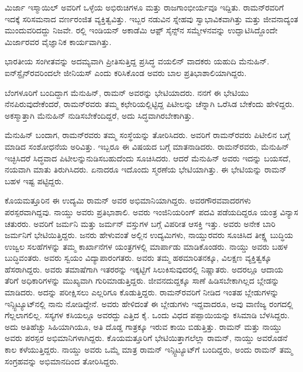 ಮಿರ್ಜಾ ಇಸ್ಮಾಯಿಲ್ ಅವರಿಗೆ ಒಳ್ಳೆಯ ಅಭಿರುಚಿಗಳೂ ಮತ್ತು ರಾಜಗಾಂಭೀರ್ಯವೂ ಇದ್ದಿತು. ರಾಮನ್‍ರವರಿಗೆ ಇದಕ್ಕೆ ಸರಿಸಮನಾದ ವರ್ಣರಂಜಿತ ವ್ಯಕ್ತಿತ್ವವಿತ್ತು. ಇಬ್ಬರ ನಡುವಿನ ಸ್ನೇಹವು ಸ್ವಾಭಾವಿಕವಾಗಿತ್ತು ಮತ್ತು ಜೀವನಾದ್ಯಂತ ಮುಂದುವರಿದದ್ದು ನಿಜವೇ. ರಲ್ಲಿ ಇಂಡಿಯನ್ ಅಕಾಡೆಮಿ ಆಫ಼್ ಸೈನ್ಸ್‌ನ ಸಮ್ಮೇಳನವನ್ನು ಉದ್ಘಾಟಿಸಿದ್ದೊಂದೇ ಮಿರ್ಜಾರವರ ವೈಜ್ಞಾನಿಕ ಕಾರ್ಯವಾಗಿತ್ತು.



ಭಾರತೀಯ ಸಂಗೀತವನ್ನು ಅದಮ್ಯವಾಗಿ ಪ್ರೀತಿಸುತ್ತಿದ್ದ ಪ್ರಸಿದ್ಧ ವಯಲಿನ್ ವಾದಕರು ಯಹುದಿ ಮೆನುಹಿನ್. ಐನ್‍ಸ್ಟೈನ್‍ರವರಿಂದಲೇ ಜೀನಿಯಸ್ ಎಂದು ಕರಿಸಿಕೊಂಡ ಅವರು ಬಾಲ ಪ್ರತಿಭಾಶಾಲಿಯಾಗಿದ್ದರು.

ಬೆಂಗಳೂರಿಗೆ ಬಂದಿದ್ದಾಗ ಮೆನುಹಿನ್, ರಾಮನ್ ಅವರನ್ನು ಭೇಟಿಯಾದರು. ನನಗೆ ಈ ಭೇಟಿಯು ನೆನಪಿರುವುದೇಕೆಂದರೆ, ರಾಮನ್‍ರವರು ತಮ್ಮ ಕಛೇರಿಯಲ್ಲಿಟ್ಟಿದ್ದ ಪಿಟೀಲನ್ನು ಚೆನ್ನಾಗಿ ಒರೆಸಿಡ ಬೇಕೆಂದು ಹೇಳಿದ್ದರು. ಅಕಸ್ಮಾತ್ತಾಗಿ ಮೆನುಹಿನ್ ನುಡಿಸಬೇಕೆಂದಿದ್ದರೆ, ಅದು ಸಿದ್ಧವಾಗಿರಬೇಕಾಗಿತ್ತು.

ಮೆನುಹಿನ್ ಬಂದಾಗ, ರಾಮನ್‍ರವರು ತಮ್ಮ ಸಂಸ್ಥೆಯನ್ನು ತೋರಿಸಿದರು. ಅವರಿಗೆ ರಾಮನ್‍ರವರು ಪಿಟೀಲಿನ ಬಗ್ಗೆ ಮಾಡಿದ ಸಂಶೋಧನೆಯ ಅರಿವಿತ್ತು. ಇಬ್ಬರೂ ಈ ವಿಷಯದ ಬಗ್ಗೆ ಮಾತನಾಡಿದರು. ರಾಮನ್‍ರವರು, ಮೆನುಹಿನ್ ಇಚ್ಛಿಸಿದರೆ ಸಿದ್ಧವಾದ ಪಿಟೀಲನ್ನು\break ನುಡಿಸಬಹುದೆಂದು ಸೂಚಿಸಿದರು. ಆದರೆ ಮೆನುಹಿನ್ ಅವರು ಇದನ್ನು ಬಯಸದೆ, ನಯವಾಗಿ ಮಾತು ತಿರುಗಿಸಿದರು. ಏನಾದರೂ ಇದೊಂದು ಸ್ಮರಣೆಯ ಭೇಟಿಯಾಗಿತ್ತು. ಈ ಭೇಟಿಯನ್ನು ರಾಮನ್ ಬಹಳ ಇಷ್ಟ ಪಟ್ಟಿದ್ದರು.



ಕೊಯಮತ್ತೂರಿನ ಈ ಉದ್ಯಮಿ ರಾಮನ್ ಅವರ ಅಭಿಮಾನಿಯಾಗಿದ್ದರು. ಅವರ\break ಗೌರವವಾದರಗಳು ಪರಸ್ಪರವಾಗಿದ್ದವು. ನಾಯ್ಡು ಅವರು ಪ್ರತಿಭಾಶಾಲಿ. ಅವರು ಇಂಜಿನಿಯರಿಂಗ್ ಪದವಿ ಪಡೆಯದಿದ್ದರೂ ಯಂತ್ರ ವಿನ್ಯಾಸ ಚತುರರು. ಅವರಿಗೆ ಜರ್ಮನಿ ಮತ್ತು ಜರ್ಮನ್ ವಸ್ತುಗಳ ಬಗ್ಗೆ ವಿಪರೀತ ಆಸಕ್ತಿ ಇತ್ತು. ಅವರು ಅನೇಕ ಬಾರಿ ಜರ್ಮನಿಗೆ ಭೇಟಿಯಿತ್ತಿದ್ದರು. ಜನರು ಹೇಳುವಂತೆ ಅಲ್ಲಿನ ಉದ್ಯಮಿಗಳು, ನಾಯ್ಡುರವರು ಸೂಚಿಸಿದ ತೀಕ್ಷ್ಣ ಬುದ್ಧಿಯ ಉಜ್ವಲ ಸಲಹೆಗಳನ್ನು ತಮ್ಮ ಕಾರ್ಖಾನೆಗಳ ಯಂತ್ರಗಳಲ್ಲಿ ಮಾರ್ಪಾಡು ಮಾಡಿಕೊಂಡರು. ನಾಯ್ಡು ಅವರು ಬಹಳ ಬುದ್ಧಿವಂತರು. ಅವರು ಸ್ವಯಂ ವಿದ್ಯಾಪಾರಂಗತರು. ಅವರು ತಮ್ಮ ಹಠಮಾರಿತನಕ್ಕೂ, ವಿಲಕ್ಷಣ ವ್ಯಕ್ತಿತ್ವಕ್ಕೂ ಹೆಸರಾಗಿದ್ದರು. ಅವರು ತಮಾಷೆಗಾಗಿ ಇತರರನ್ನು ಇಕ್ಕಟ್ಟಿಗೆ ಸಿಲುಕಿಸುವುದರಲ್ಲಿ ನಿಷ್ಣಾತರು. ಅದರಲ್ಲೂ ಆದಾಯ ತೆರಿಗೆ ಅಧಿಕಾರಿಗಳನ್ನು ಮುಖ್ಯವಾಗಿ ಗುರಿಮಾಡುತ್ತಿದ್ದರು. ಜೀವನದುದ್ದಕ್ಕೂ ಸಾಣೆ ಹಿಡಿಸಬೇಕಾಗಿಲ್ಲದ ಬ್ಲೇಡನ್ನು ಮಾಡಿದರು. ಅದನ್ನು ಪರೀಕ್ಷಿಸಲು ಎಲ್ಲರಿಗೂ ಕೊಡುತ್ತಿದ್ದರು. ರಾಮನ್‍ರವರಿಗೆ ನೀಡಿದ ಇಂತಹ ಬ್ಲೇಡುಗಳನ್ನು ಇನ್ಸ್ಟಿಟ್ಯೂಟ್‍ನಲ್ಲಿ ನಾನು ನೋಡಿದ್ದೇನೆ. ಅವರು ಹೇಳಿದಂತೆ ಈ ಬ್ಲೇಡುಗಳು ಇದ್ದವಾದರೂ, ಅವು ವಾಣಿಜ್ಯ ರಂಗದಲ್ಲಿ ಗೆಲ್ಲಲಾಗಲಿಲ್ಲ. ಸಸ್ಯಗಳ ಕಸಿಯಲ್ಲೂ ಅವರದ್ದು ಎತ್ತಿದ ಕೈ. ಒಂದು ವಿಧದ ಪಪ್ಪಾಯಿಯನ್ನು ಕಸಿಮಾಡಿ ಬೆಳಸಿದ್ದರು. ಅದು ಅತಿಹೆಚ್ಚು ಸಿಹಿಯಾಗಿಯೂ, ಅತಿ ದೊಡ್ಡ ಗಾತ್ರಕ್ಕೂ ಇರುವ ಕಾಯಿ ಬಿಡುತ್ತಿತ್ತು. ರಾಮನ್ ಮತ್ತು ನಾಯ್ಡು ಅವರು ಪರಸ್ಪರ ಅಭಿಮಾನಿಗಳಾಗಿದ್ದರು. ಕೊಯಮತ್ತೂರಿಗೆ ಭೇಟಿಯಿತ್ತಾಗಲೆಲ್ಲಾ ರಾಮನ್, ನಾಯ್ಡು ಅವರೊಡನೆ ಕಾಲ ಕಳೆಯುತ್ತಿದ್ದರು. ನಾಯ್ಡು ಅವರು ಒಮ್ಮೆ ಮಾತ್ರ ರಾಮನ್ ಇನ್ಸ್ಟಿಟ್ಯೂಟ್‍ಗೆ ಬಂದಿದ್ದರು, ಅಂದು ರಾಮನ್ ತಮ್ಮ ಸಂಗ್ರಹವನ್ನು ಅಭಿಮಾನದಿಂದ ತೋರಿಸಿದ್ದರು.

